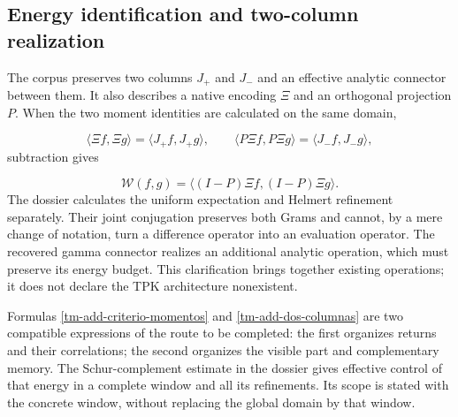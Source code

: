 \subsection{Energy identification and two-column realization}
\label{tm-add-c6}
The corpus preserves two columns \(J_+\) and \(J_-\) and an effective analytic connector between them. It also describes a native encoding \(\Xi\) and an orthogonal projection \(P\). When the two moment identities are calculated on the same domain,

\[
\langle\Xi f,\Xi g\rangle=\langle J_+f,J_+g\rangle,
\qquad
\langle P\Xi f,P\Xi g\rangle=\langle J_-f,J_-g\rangle,
\]
subtraction gives

\begin{equation}
\mathscr W(f,g)=\langle(I-P)\Xi f,(I-P)\Xi g\rangle.
\label{tm-add-dos-columnas}
\end{equation}
The dossier calculates the uniform expectation and Helmert refinement separately. Their joint conjugation preserves both Grams and cannot, by a mere change of notation, turn a difference operator into an evaluation operator. The recovered gamma connector realizes an additional analytic operation, which must preserve its energy budget. This clarification brings together existing operations; it does not declare the TPK architecture nonexistent.

Formulas \eqref{tm-add-criterio-momentos} and \eqref{tm-add-dos-columnas} are two compatible expressions of the route to be completed: the first organizes returns and their correlations; the second organizes the visible part and complementary memory. The Schur-complement estimate in the dossier gives effective control of that energy in a complete window and all its refinements. Its scope is stated with the concrete window, without replacing the global domain by that window.


% 
% 

